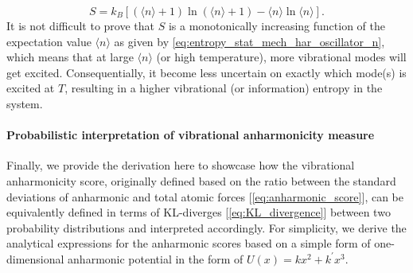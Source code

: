 \begin{equation}
    \label{eq:entropy_stat_mech_har_oscillator_n}
    S=k_B\left[ (\langle n\rangle+1)\ln(\langle n\rangle+1) -\langle n\rangle \ln\langle n\rangle\right].
\end{equation}
It is not difficult to prove that $S$ is a monotonically increasing function of the expectation value $\langle n\rangle$ as given by \cref{eq:entropy_stat_mech_har_oscillator_n}, which means that at large $\langle n\rangle$ (or high temperature), more vibrational modes will get excited. Consequentially, it become less uncertain on exactly which mode(s) is excited at $T$, resulting in a higher vibrational (or information) entropy in the system.

\paragraph{\textbf{Probabilistic interpretation of vibrational anharmonicity measure}}
Finally, we provide the derivation here to showcase how  the vibrational anharmonicity score,\cite{knoop2020anharmonicity} originally defined based on the ratio between the standard deviations of anharmonic and total atomic forces [\cref{eq:anharmonic_score}], can be equivalently defined in terms of KL-diverges [\cref{eq:KL_divergence}] between two probability distributions and interpreted accordingly. For simplicity, we derive the analytical expressions for the anharmonic scores based on a simple form of one-dimensional anharmonic potential in the form of $U(x)=kx^2+k^{\prime}x^3$. 

